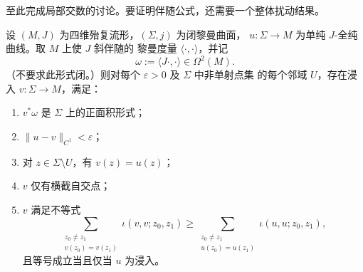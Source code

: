 至此完成局部交数的讨论。要证明伴随公式，还需要一个整体扰动结果。

\begin{proposition}\label{prop:E-2-4}
设 $(M,J)$ 为四维殆复流形，$(\Sigma,j)$ 为闭黎曼曲面，
$u:\Sigma\to M$ 为单纯 $J$-全纯曲线。取 $M$ 上使 $J$ 斜伴随的
黎曼度量 $\langle\cdot,\cdot\rangle$，并记
\[
  \omega:=\langle J\cdot,\cdot\rangle\in\Omega^2(M).
\]
（不要求此形式闭。）则对每个 $\varepsilon>0$ 及 $\Sigma$ 中非单射点集
的每个邻域 $U$，存在浸入 $v:\Sigma\to M$，满足：
\begin{enumerate}
  \item[(i)] $v^*\omega$ 是 $\Sigma$ 上的正面积形式；
  \item[(ii)] $\|u-v\|_{C^1}<\varepsilon$；
  \item[(iii)] 对 $z\in\Sigma\setminus U$，有 $v(z)=u(z)$；
  \item[(iv)] $v$ 仅有横截自交点；
  \item[(v)] $v$ 满足不等式
    \begin{equation}\label{eq:E-2-3}
      \sum_{\substack{z_0\ne z_1\\v(z_0)=v(z_1)}}
        \iota(v,v;z_0,z_1)
      \ge
      \sum_{\substack{z_0\ne z_1\\u(z_0)=u(z_1)}}
        \iota(u,u;z_0,z_1),
    \end{equation}
    且等号成立当且仅当 $u$ 为浸入。
\end{enumerate}
\end{proposition}

